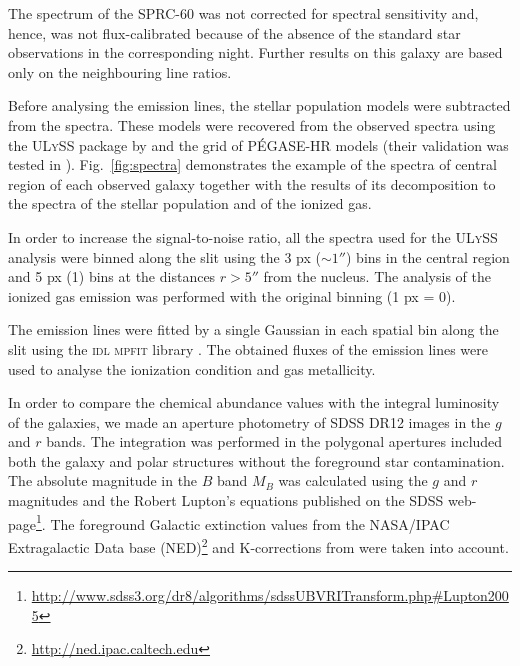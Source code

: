\documentclass[useAMS,usenatbib]{mnras}
\begin{document}
The spectrum of the SPRC-60 was not corrected for spectral sensitivity and, hence, was not flux-calibrated because of the absence of the standard star observations in the corresponding night. Further results on this galaxy are based only on the neighbouring line ratios. 



Before analysing the emission lines, the stellar population models were subtracted from the spectra. These models were recovered from the observed spectra using the \textsc{ULySS} package by \cite{ulyss} and the grid of P{\'E}GASE-HR models (their validation was tested in \citealt{ulyss_models}). Fig.~\ref{fig:spectra} demonstrates the example of the spectra of central region of each observed galaxy together with the results of its decomposition to the spectra of the stellar population and of the ionized gas.

In order to increase the signal-to-noise ratio, all the spectra used for the \textsc{ULySS} analysis were binned along the slit using the 3 px ($\sim1''$) bins in the central region and 5 px (1) bins at the distances $r>5''$ from the nucleus. The analysis of the ionized gas emission was performed with the original binning (1 px = 0).  

The emission lines were fitted by a single Gaussian  in each spatial bin along the slit using the \textsc{idl} \textsc{mpfit} library \citep{mpfit}. The obtained fluxes of the emission lines were used to analyse the ionization condition and gas metallicity. 

In order to compare the chemical abundance values with the integral  luminosity of the galaxies, we made an aperture photometry of SDSS DR12 \citep{sdss_dr12} images in the $g$ and $r$ bands. The integration was performed in the polygonal apertures included both the galaxy and polar structures without the foreground star contamination. The absolute magnitude in the $B$ band $M_B$ was calculated  using the  $g$ and $r$ magnitudes  and the Robert Lupton's  equations published on the SDSS web-page\footnote{\url{http://www.sdss3.org/dr8/algorithms/sdssUBVRITransform.php\#Lupton2005}}.  The foreground
Galactic extinction values from the NASA/IPAC Extragalactic Data
base (NED)\footnote{\url{http://ned.ipac.caltech.edu}} and K-corrections from \citet{Chilingarian2010} were taken into account.
\end{document}
